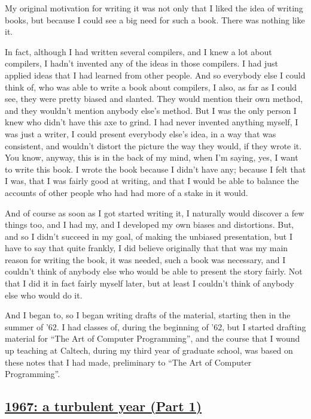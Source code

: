 \documentclass[]{article}
\begin{document}
My original motivation for writing it was not only that I liked the idea
of writing books, but because I could see a big need for such a book.
There was nothing like it.

In fact, although I had written several compilers, and I knew a lot
about compilers, I hadn't invented any of the ideas in those compilers.
I had just applied ideas that I had learned from other people. And so
everybody else I could think of, who was able to write a book about
compilers, I also, as far as I could see, they were pretty biased and
slanted. They would mention their own method, and they wouldn't mention
anybody else's method. But I was the only person I knew who didn't have
this axe to grind. I had never invented anything myself, I was just a
writer, I could present everybody else's idea, in a way that was
consistent, and wouldn't distort the picture the way they would, if they
wrote it. You know, anyway, this is in the back of my mind, when I'm
saying, yes, I want to write this book. I wrote the book because I
didn't have any; because I felt that I was, that I was fairly good at
writing, and that I would be able to balance the accounts of other
people who had had more of a stake in it would.

And of course as soon as I got started writing it, I naturally would
discover a few things too, and I had my, and I developed my own biases
and distortions. But, and so I didn't succeed in my goal, of making the
unbiased presentation, but I have to say that quite frankly, I did
believe originally that that was my main reason for writing the book, it
was needed, such a book was necessary, and I couldn't think of anybody
else who would be able to present the story fairly. Not that I did it in
fact fairly myself later, but at least I couldn't think of anybody else
who would do it.

And I began to, so I began writing drafts of the material, starting then
in the summer of '62. I had classes of, during the beginning of '62, but
I started drafting material for ``The Art of Computer Programming'', and
the course that I wound up teaching at Caltech, during my third year of
graduate school, was based on these notes that I had made, preliminary
to ``The Art of Computer Programming''.

\subsection{\texorpdfstring{\href{http://webofstories.com/play/17093}{1967:
a turbulent year (Part
1)}}{1967: a turbulent year (Part 1)}}\label{a-turbulent-year-part-1}
\end{document}
